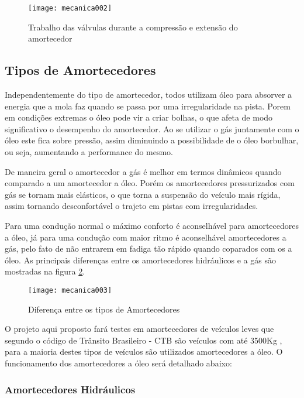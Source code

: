 			\begin{figure}[h]
				\centering
				\texttt{[image: mecanica002]}
				\caption[Trabalho das válvulas durante a compressão e extensão do amortecedor]{Trabalho das válvulas durante a compressão e extensão do amortecedor \cite{DOliveira}}
				\label{mecanica002}
			\end{figure}

		\subsection{Tipos de Amortecedores}

			Independentemente do tipo de amortecedor, todos utilizam óleo para absorver a energia que a mola faz quando se passa por uma irregularidade na pista. Porem em condições extremas o óleo pode vir a criar bolhas, o que afeta de modo significativo o desempenho do amortecedor. Ao se utilizar o gás juntamente com o óleo este fica sobre pressão, assim diminuindo a possibilidade de o óleo borbulhar, ou seja, aumentando a performance do mesmo.


			De maneira geral o amortecedor a gás é melhor em termos dinâmicos quando comparado a um amortecedor a óleo. Porém os amortecedores pressurizados com gás se tornam mais elásticos, o que torna a suspensão do veículo mais rígida, assim tornando desconfortável o trajeto em pistas com irregularidades. 


			Para uma condução normal o máximo conforto é aconselhável para amortecedores a óleo, já para uma condução com maior ritmo é aconselhável amortecedores a gás, pelo fato de não entrarem em fadiga tão rápido quando coparados com os a óleo. As principais diferenças entre os amortecedores hidráulicos e a gás são mostradas na figura \ref{mecanica003}. 

			\begin{figure}[h]
				\centering
				\texttt{[image: mecanica003]}
				\caption{Diferença entre os tipos de Amortecedores}
				\label{mecanica003}
			\end{figure}

			O projeto aqui proposto fará testes em amortecedores de veículos leves que segundo o código de Trânsito Brasileiro - CTB são veículos com até 3500Kg \cite{Portaria21}, para a maioria destes tipos de veículos são utilizados amortecedores a óleo. O funcionamento dos amortecedores a óleo será detalhado abaixo: 

		\subsubsection{Amortecedores Hidráulicos}
		
